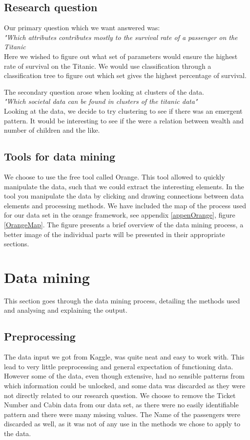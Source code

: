 \documentclass[a4paper,11pt]{article}
\begin{document}
\subsection{Research question}
Our primary question which we want answered was:\\
\textit{"Which attributes contributes mostly to the survival rate of a passenger on the Titanic}\\
Here we wished to figure out what set of parameters would ensure the highest rate of survival on the Titanic. We would use classification through a classification tree to figure out which set gives the highest percentage of survival.

The secondary question arose when looking at clusters of the data.\\
\textit{"Which societal data can be found in clusters of the titanic data"}\\
Looking at the data, we decide to try clustering to see if there was an emergent pattern. It would be interesting to see if the were a relation between wealth and number of children and the like. 
\subsection{Tools for data mining}
We choose to use the free tool called Orange\cite{orange}. This tool allowed to quickly manipulate the data, such that we could extract the interesting elements. 
In the tool you manipulate the data by clicking and drawing connections between data elements and processing methods. We have included the map of the process used for our data set in the orange framework, see appendix \ref{appenOrange}, figure \ref{OrangeMap}. The figure presents a brief overview of the data mining process, a better image of the individual parts will be presented in their appropriate sections. 

\clearpage
\section{Data mining}
This section goes through the data mining process, detailing the methods used and analysing and explaining the output. 
\subsection{Preprocessing}
The data input we got from Kaggle\cite{kaggleData}, was quite neat and easy to work with. This lead to very little preprocessing and general expectation of functioning data. 
However some of the data, even though extensive, had no sensible patterns from which information could be unlocked, and some data was discarded as they were not directly related to our research question.
We choose to remove the Ticket Number and Cabin data from our data set, as there were no easily identifiable pattern and there were many missing values. 
The Name of the passengers were discarded as well, as it was not of any use in the methods we chose to apply to the data. 
\end{document}
